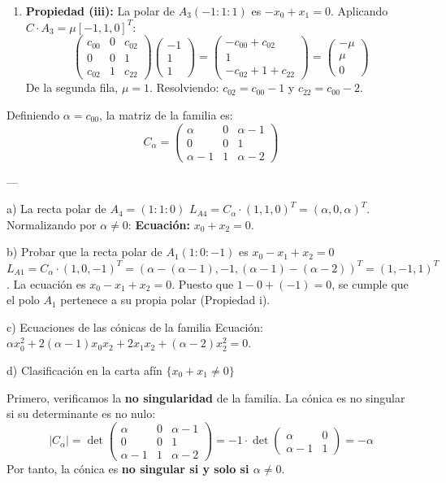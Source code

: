 {\begin{enumerate}
    \item \textbf{Propiedad (iii):} La polar de $A_3(-1:1:1)$ es $-x_0 + x_1 = 0$. Aplicando $C \cdot A_3 = \mu [-1, 1, 0]^T$:
    \[ \begin{pmatrix} c_{00} & 0 & c_{02} \\ 0 & 0 & 1 \\ c_{02} & 1 & c_{22} \end{pmatrix} \begin{pmatrix} -1 \\ 1 \\ 1 \end{pmatrix} = \begin{pmatrix} -c_{00} + c_{02} \\ 1 \\ -c_{02} + 1 + c_{22} \end{pmatrix} = \begin{pmatrix} -\mu \\ \mu \\ 0 \end{pmatrix} \]
    De la segunda fila, $\mu = 1$. Resolviendo: $c_{02} = c_{00} - 1$ y $c_{22} = c_{00} - 2$.
\end{enumerate}

Definiendo $\alpha = c_{00}$, la matriz de la familia es:
\[ C_{\alpha} = \begin{pmatrix} \alpha & 0 & \alpha-1 \\ 0 & 0 & 1 \\ \alpha-1 & 1 & \alpha-2 \end{pmatrix} \]

---



a) La recta polar de $A_4 = (1:1:0)$
$L_{A4} = C_{\alpha} \cdot (1, 1, 0)^T = (\alpha, 0, \alpha)^T$. Normalizando por $\alpha \neq 0$:
\textbf{Ecuación:} $x_0 + x_2 = 0$.

b) Probar que la recta polar de $A_1(1:0:-1)$ es $x_0 - x_1 + x_2 = 0$
$L_{A1} = C_{\alpha} \cdot (1, 0, -1)^T = (\alpha - (\alpha - 1), -1, (\alpha - 1) - (\alpha - 2))^T = (1, -1, 1)^T$.
La ecuación es $x_0 - x_1 + x_2 = 0$. Puesto que $1 - 0 + (-1) = 0$, se cumple que el polo $A_1$ pertenece a su propia polar (Propiedad i).

c) Ecuaciones de las cónicas de la familia
Ecuación: $\alpha x_0^2 + 2(\alpha-1)x_0x_2 + 2x_1x_2 + (\alpha-2)x_2^2 = 0$.

d) Clasificación en la carta afín $\{x_0 + x_1 \neq 0\}$

Primero, verificamos la \textbf{no singularidad} de la familia. La cónica es no singular si su determinante es no nulo:
\[ |C_{\alpha}| = \det \begin{pmatrix} \alpha & 0 & \alpha-1 \\ 0 & 0 & 1 \\ \alpha-1 & 1 & \alpha-2 \end{pmatrix} = -1 \cdot \det \begin{pmatrix} \alpha & 0 \\ \alpha-1 & 1 \end{pmatrix} = -\alpha \]
Por tanto, la cónica es \textbf{no singular si y solo si $\alpha \neq 0$}.

}
